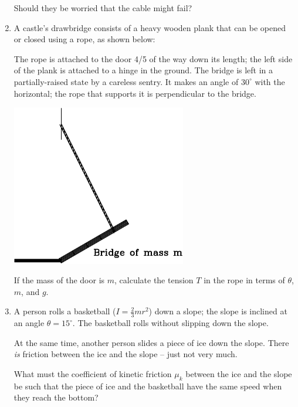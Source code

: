 \documentclass[12pt]{article}
\begin{document}
\begin{enumerate}
	Should they be worried that the cable might fail?
	
	\bigskip
	\bigskip
	\item A castle's drawbridge consists of a heavy wooden plank that can be opened or closed using a rope, as shown below:
	
	\begin{minipage}{0.5\textwidth}
		The rope is attached to the door 4/5 of the way down its length; the left side of the plank is attached to a hinge
		in the ground.
		The bridge is left in a partially-raised state by a careless sentry. It makes an angle of $30^\circ$ with the horizontal; the rope that supports it is perpendicular to the
		bridge.
	\end{minipage}
	\begin{minipage}{0.5\textwidth}
		\begin{center}
			\includegraphics[width=0.6\textwidth]{door-crop.pdf}
		\end{center}
		
	\end{minipage}
	\medskip
	
	If the mass of the door is $m$, calculate the tension $T$ in the rope in terms of $\theta$, $m$, and $g$.
	
		\bigskip
	
	\bigskip
	
\item A person rolls a basketball ($I=\frac{2}{3}mr^2$) down a slope; the slope is inclined at an angle $\theta=15^\circ$. The basketball rolls without slipping down the slope.

At the same time, another person slides a piece of ice down the slope. There {\it is} friction between the ice and the slope -- just not very much.

What must the coefficient of kinetic friction $\mu_k$ between the ice and the slope be such that the piece of ice and the basketball have the same speed when they reach the bottom?


\end{enumerate}
\end{document}

